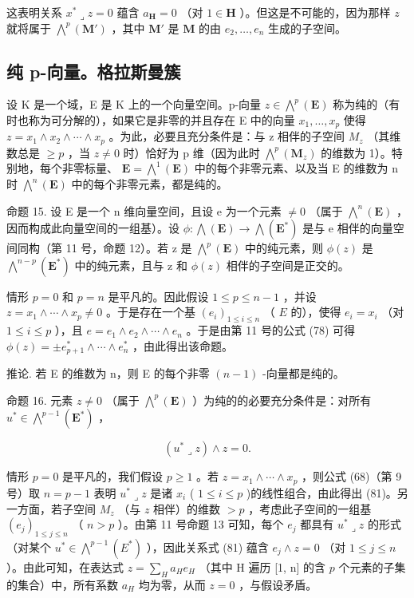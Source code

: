 这表明关系 \(x^{*} \lrcorner z = 0\) 蕴含 \(a_{\mathbf{H}} = 0\) （对 \(1 \in \mathbf{H}\) ）。但这是不可能的，因为那样 \(z\) 就将属于 \(\bigwedge^{p}(\mathbf{M}')\) ，其中 \(\mathbf{M}'\) 是 \(\mathbf{M}\) 的由 \(e_2, \ldots, e_n\) 生成的子空间。

\subsection{纯 p-向量。格拉斯曼簇}

设 K 是一个域，E 是 K 上的一个向量空间。p-向量 \(z \in \bigwedge^{p}(\mathbf{E})\) 称为纯的（有时也称为可分解的），如果它是非零的并且存在 E 中的向量 \(x_{1}, \ldots, x_{p}\) 使得 \(z = x_{1} \wedge x_{2} \wedge \cdots \wedge x_{p}\) 。为此，必要且充分条件是：与 z 相伴的子空间 \(M_{z}\) （其维数总是 \(\geqslant p\) ，当 \(z \neq 0\) 时）恰好为 p 维（因为此时 \(\bigwedge^{p}(\mathbf{M}_{z})\) 的维数为 1）。特别地，每个非零标量、 \(\mathbf{E} = \bigwedge^{1}(\mathbf{E})\) 中的每个非零元素、以及当 E 的维数为 n 时 \(\bigwedge^{n}(\mathbf{E})\) 中的每个非零元素，都是纯的。

命题 15. 设 E 是一个 n 维向量空间，且设 e 为一个元素 \(\neq0\) （属于 \(\bigwedge^{n}(\mathbf{E})\) ，因而构成此向量空间的一组基）。设 \(\phi:\bigwedge(\mathbf{E})\to\bigwedge(\mathbf{E}^{*})\) 是与 e 相伴的向量空间同构（第 11 号，命题 12）。若 z 是 \(\bigwedge^{p}(\mathbf{E})\) 中的纯元素，则 \(\phi(z)\) 是 \(\bigwedge^{n-p}(\mathbf{E}^{*})\) 中的纯元素，且与 z 和 \(\phi(z)\) 相伴的子空间是正交的。

情形 \(p = 0\) 和 \(p = n\) 是平凡的。因此假设 \(1 \leqslant p \leqslant n - 1\) ，并设 \(z = x_1 \wedge \cdots \wedge x_p \neq 0\) 。于是存在一个基 \((e_i)_{1 \leqslant i \leqslant n}\) （ \(E\) 的），使得 \(e_i = x_i\) （对 \(1 \leqslant i \leqslant p\) ），且 \(e = e_1 \wedge e_2 \wedge \cdots \wedge e_n\) 。于是由第 11 号的公式 (78) 可得 \(\phi(z) = \pm e_{p+1}^* \wedge \cdots \wedge e_n^*\) ，由此得出该命题。

推论. 若 E 的维数为 n，则 E 的每个非零 \((n - 1)\) -向量都是纯的。

命题 16. 元素 \(z \neq 0\) （属于 \(\bigwedge^{p}(\mathbf{E})\) ）为纯的的必要充分条件是：对所有 \(u^{*} \in \bigwedge^{p-1}(\mathbf{E}^{*})\) ，

\[
(u ^ {*} \lrcorner z) \wedge z = 0.\tag{81}
\]

情形 \(p = 0\) 是平凡的，我们假设 \(p \geqslant 1\) 。若 \(z = x_1 \wedge \cdots \wedge x_p\) ，则公式 (68)（第 9 号）取 \(n = p - 1\) 表明 \(u^* \lrcorner z\) 是诸 \(x_i\) ( \(1 \leqslant i \leqslant p\) )的线性组合，由此得出 (81)。另一方面，若子空间 \(M_z\) （与 \(z\) 相伴）的维数 \(>p\) ，考虑此子空间的一组基 \((e_j)_{1 \leqslant j \leqslant n}\) （ \(n >p\) ）。由第 11 号命题 13 可知，每个 \(e_j\) 都具有 \(u^* \lrcorner z\) 的形式（对某个 \(u^* \in \bigwedge^{p-1}(E^*)\) ），因此关系式 (81) 蕴含 \(e_j \wedge z = 0\) （对 \(1 \leqslant j \leqslant n\) ）。由此可知，在表达式 \(z = \sum_{H} a_H e_H\) （其中 H 遍历 {[}1, n{]} 的含 \(p\) 个元素的子集的集合）中，所有系数 \(a_H\) 均为零，从而 \(z = 0\) ，与假设矛盾。


